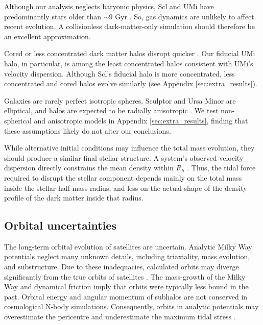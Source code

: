 Although our analysis neglects baryonic physics, Scl and UMi have
predominantly stars older than \(\sim 9\) Gyr
\citep{carrera+2002, deboer+2011, weisz+2014, delosreyes+2022, sato+2025}.
So, gas dynamics are unlikely to affect recent evolution. A
collisionless dark-matter-only simulation should therefore be an
excellent approximation.

Cored or less concentrated dark matter halos disrupt quicker
\citep[e.g.,][]{stucker+2023}. Our fiducial UMi halo, in particular, is
among the least concentrated halos consistent with UMi's velocity
dispersion. Although Scl's fiducial halo is more concentrated, less
concentrated and cored halos evolve similarly (see Appendix
\ref{sec:extra_results}).

Galaxies are rarely perfect isotropic spheres. Sculptor and Ursa Minor
are elliptical, and halos are expected to be radially anisotropic
\citep[e.g.,][]{navarro+2010}. We test non-spherical and anisotropic
models in Appendix \ref{sec:extra_results}, finding that these
assumptions likely do not alter our conclusions.

While alternative initial conditions may influence the total mass
evolution, they should produce a similar final stellar structure. A
system's observed velocity dispersion directly constrains the mean
density within \(R_h\) \citep[e.g.,][]{wolf+2010}. Thus, the tidal force
required to disrupt the stellar component depends mainly on the total
mass inside the stellar half-mass radius, and less on the actual shape
of the density profile of the dark matter inside that radius.

\subsection{Orbital uncertainties}\label{sec:scl_umi_orbit_uncert}

The long-term orbital evolution of satellites are uncertain. Analytic
Milky Way potentials neglect many unknown details, including
triaxiality, mass evolution, and substructure. Due to these
inadequacies, calculated orbits may diverge significantly from the true
orbits of satellites \citep[e.g.,][]{dsouza+bell2022}. The mass-growth
of the Milky Way and dynamical friction imply that orbits were typically
less bound in the past. Orbital energy and angular momentum of subhalos
are not conserved in cosmological N-body simulations. Consequently,
orbits in analytic potentials may overestimate the pericentre and
underestimate the maximum tidal stress \citep[although typically not by
enough to change our
conclusions,][]{santistevan+2023, santistevan+2024}.

